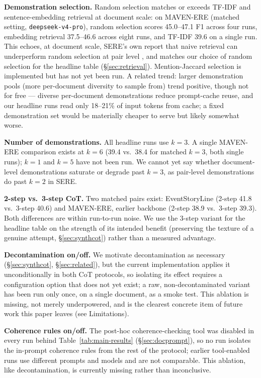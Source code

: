 \documentclass[11pt]{article}
\begin{document}
\textbf{Demonstration selection.} Random selection matches or exceeds TF-IDF and
sentence-embedding retrieval at document scale: on MAVEN-ERE (matched setting,
\texttt{deepseek-v4-pro}), random selection scores 45.0--47.1 F1 across four runs,
embedding retrieval 37.5--46.6 across eight runs, and TF-IDF 39.6 on a single run.
This echoes, at document scale, SERE's own report that naive retrieval can
underperform random selection at pair level \citep{hao2026sere}, and matches our
choice of random selection for the headline table (\S\ref{sec:retrieval}).
Mention-Jaccard selection is implemented but has not yet been run. A related
trend: larger demonstration pools (more per-document diversity to sample from)
trend positive, though not for free --- diverse per-document demonstrations reduce
prompt-cache reuse, and our headline runs read only 18--21\% of input tokens from
cache; a fixed demonstration set would be materially cheaper to serve but likely
somewhat worse.

\textbf{Number of demonstrations.} All headline runs use $k=3$. A single MAVEN-ERE
comparison exists at $k=6$ (39.4 vs.\ 38.4 for matched $k=3$, both single runs);
$k=1$ and $k=5$ have not been run. We cannot yet say whether document-level
demonstrations saturate or degrade past $k=3$, as pair-level demonstrations do
past $k=2$ in SERE.

\textbf{2-step vs.\ 3-step CoT.} Two matched pairs exist: EventStoryLine (2-step
41.8 vs.\ 3-step 40.6) and MAVEN-ERE, earlier backbone (2-step 38.9 vs.\ 3-step
39.3). Both differences are within run-to-run noise. We use the 3-step variant for
the headline table on the strength of its intended benefit (preserving the texture
of a genuine attempt, \S\ref{sec:synthcot}) rather than a measured advantage.

\textbf{Decontamination on/off.} We motivate decontamination as necessary
(\S\ref{sec:synthcot}, \S\ref{sec:related}), but the current implementation applies
it unconditionally in both CoT protocols, so isolating its effect requires a
configuration option that does not yet exist; a raw, non-decontaminated variant
has been run only once, on a single document, as a smoke test. This ablation is
missing, not merely underpowered, and is the clearest concrete item of future work
this paper leaves (see Limitations).

\textbf{Coherence rules on/off.} The post-hoc coherence-checking tool was disabled
in every run behind Table~\ref{tab:main-results} (\S\ref{sec:docprompt}), so no
run isolates the in-prompt coherence rules from the rest of the protocol; earlier
tool-enabled runs use different prompts and models and are not comparable. This
ablation, like decontamination, is currently missing rather than inconclusive.
\end{document}
